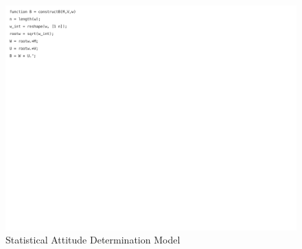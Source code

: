 \begin{figure}[H]
    \centering
    \captionsetup{ justification = centering }
    \includegraphics[trim={0cm 15cm 10cm 0cm},clip,width = 15cm]{Images/PS6/statisticalAttitude-3.png}
    \caption{Statistical Attitude Determination Model}
    \label{fig:stat_attitude}
\end{figure}
